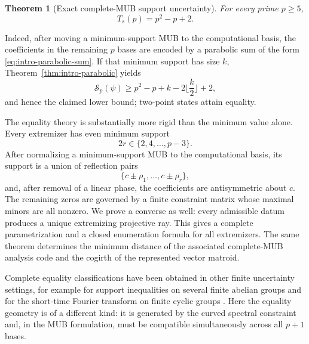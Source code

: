\documentclass[11pt]{article}
\newtheorem{theorem}{Theorem}[section]
\begin{document}
\begin{theorem}[Exact complete-MUB support uncertainty]
\label{thm:intro-exact}
For every prime $p\ge5$,
\[
 \boxed{T_s(p)=p^2-p+2.}
\]
\end{theorem}

Indeed, after moving a minimum-support MUB to the computational basis, the
coefficients in the remaining $p$ bases are encoded by a parabolic sum of the
form \eqref{eq:intro-parabolic-sum}.  If that minimum support has size $k$,
Theorem~\ref{thm:intro-parabolic} yields
\[
 \mathcal S_p(\psi)
 \ge
 p^2-p+k-2\Big\lfloor\frac{k}{2}\Big\rfloor+2,
\]
and hence the claimed lower bound; two-point states attain equality.

The equality theory is substantially more rigid than the minimum value
alone.  Every extremizer has even minimum support
\[
 2r\in\{2,4,\ldots,p-3\}.
\]
After normalizing a minimum-support MUB to the computational basis, its
support is a union of reflection pairs
\[
 \{c\pm\rho_1,\ldots,c\pm\rho_r\},
\]
and, after removal of a linear phase, the coefficients are antisymmetric
about $c$.  The remaining zeros are governed by a finite constraint matrix
whose maximal minors are all nonzero.  We prove a converse as well: every
admissible datum produces a unique extremizing projective ray.  This gives a
complete parametrization and a closed enumeration formula for all
extremizers.  The same theorem determines the minimum distance of the
associated complete-MUB analysis code and the cogirth of the represented
vector matroid.

Complete equality classifications have been obtained in other finite
uncertainty settings, for example for support inequalities on several finite
abelian groups \cite{BonamiGhobber} and for the short-time Fourier transform
on finite cyclic groups \cite{NicolaSTFT}.  Here the equality geometry is of
a different kind: it is generated by the curved spectral constraint and, in
the MUB formulation, must be compatible simultaneously across all $p+1$
bases.
\end{document}
